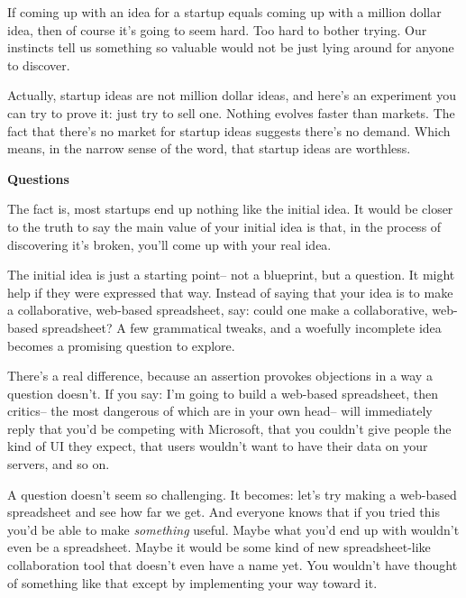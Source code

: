 If coming up with an idea
                    for a startup equals coming up with a million dollar idea,
                    then of course it's going to seem hard. Too hard to bother
                    trying. Our instincts tell us something so valuable would
                    not be just lying around for anyone to discover.

Actually,
                    startup ideas are not million dollar ideas, and here's an
                    experiment you can try to prove it: just try to sell one.
                    Nothing evolves faster than markets. The fact that there's
                    no market for startup ideas suggests there's no demand.
                    Which means, in the narrow sense of the word, that startup
                    ideas are worthless.

\textbf{Questions}

The fact is, most startups end up nothing like
                    the initial idea. It would be closer to the truth to say the
                    main value of your initial idea is that, in the process of
                    discovering it's broken, you'll come up with your real
                    idea.

The initial idea is just a starting point--
                    not a blueprint, but a question. It might help if they were
                    expressed that way. Instead of saying that your idea is to
                    make a collaborative, web-based spreadsheet, say: could one
                    make a collaborative, web-based spreadsheet? A few
                    grammatical tweaks, and a woefully incomplete idea becomes a
                    promising question to explore.

There's a real
                    difference, because an assertion provokes objections in a
                    way a question doesn't. If you say: I'm going to build a
                    web-based spreadsheet, then critics-- the most dangerous of
                    which are in your own head-- will immediately reply that
                    you'd be competing with Microsoft, that you couldn't give
                    people the kind of UI they expect, that users wouldn't want
                    to have their data on your servers, and so on.

A
                    question doesn't seem so challenging. It becomes: let's try
                    making a web-based spreadsheet and see how far we get. And
                    everyone knows that if you tried this you'd be able to make
                    \emph{something} useful. Maybe what you'd end up with
                    wouldn't even be a spreadsheet. Maybe it would be some kind
                    of new spreadsheet-like collaboration tool that doesn't even
                    have a name yet. You wouldn't have thought of something like
                    that except by implementing your way toward it.

